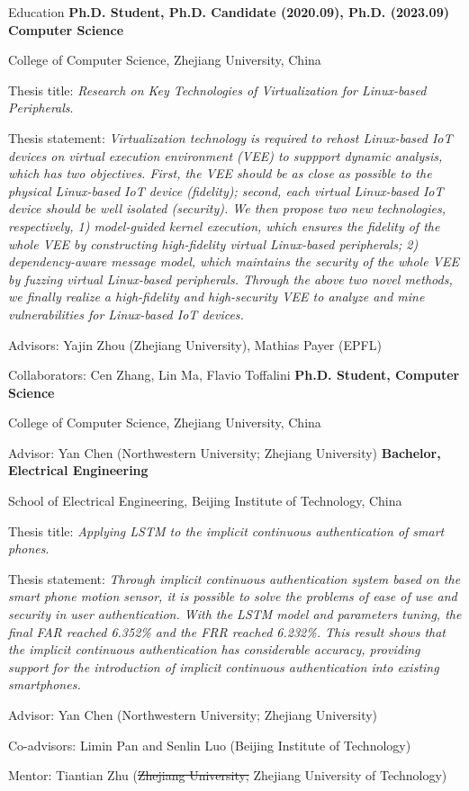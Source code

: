 \begin{rubric}{Education}
\entry*[2019.05 -- 2023.09]
	\textbf{Ph.D. Student, Ph.D. Candidate (2020.09), Ph.D. (2023.09) Computer Science}
	\par {College of Computer Science, Zhejiang University, China}
	\par Thesis title: 
	\emph{Research on Key Technologies of Virtualization for Linux-based Peripherals}.
	\par Thesis statement:
	\emph{Virtualization technology is required to rehost Linux-based IoT
	devices on virtual execution environment (VEE) to suppport dynamic analysis,
	which has two objectives. First, the VEE should be as close as possible to
	the physical Linux-based IoT device (fidelity); second, each virtual
	Linux-based IoT device should be well isolated (security). We then propose
	two new technologies, respectively, 1) model-guided kernel execution, which
	ensures the fidelity of the whole VEE by constructing high-fidelity virtual
	Linux-based peripherals; 2) dependency-aware message model, which maintains
	the security of the whole VEE by fuzzing virtual Linux-based peripherals.
	Through the above two novel methods, we finally realize a high-fidelity and
	high-security VEE to analyze and mine vulnerabilities for Linux-based IoT
	devices.}

	\par Advisors: Yajin Zhou (Zhejiang University), Mathias Payer (EPFL)
	\par Collaborators: Cen Zhang, Lin Ma, Flavio Toffalini
\entry*[2018.09 -- 2019.05]
	\textbf{Ph.D. Student, Computer Science}
	\par {College of Computer Science, Zhejiang University, China}
	\par Advisor: Yan Chen (Northwestern University; Zhejiang University)
\entry*[2014.09 -- 2018.06]
	\textbf{Bachelor, Electrical Engineering}
	\par {School of Electrical Engineering, Beijing Institute of Technology, China} 
	\par Thesis title: 
	\emph{Applying LSTM to the implicit continuous authentication of smart phones}.
	\par Thesis statement:
	\emph{Through implicit continuous authentication system based on the 
	smart phone motion sensor, it is possible to solve the problems of ease of use
	and security in user authentication. With the LSTM model and parameters tuning, 
	the final FAR reached 6.352\% and the FRR reached 6.232\%. This result shows that
	the implicit continuous authentication has considerable accuracy, providing
	support for the introduction of implicit continuous authentication into existing
	smartphones.}
	\par Advisor: Yan Chen (Northwestern University; Zhejiang University)
	\par Co-advisors: Limin Pan and Senlin Luo (Beijing Institute of Technology)
	\par Mentor: Tiantian Zhu (\st{Zhejiang University;} Zhejiang University of Technology)
\end{rubric}